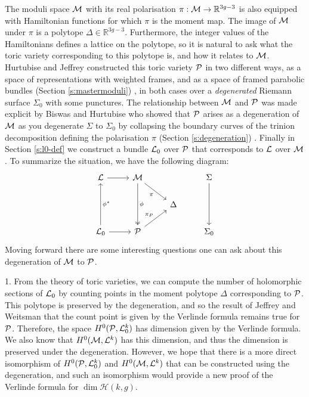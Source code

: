 The moduli space $\mathcal{M}$ with its real polarisation $\pi:\mathcal{M}\to\mathbb{R}^{3g-3}$ is also equipped with Hamiltonian functions for which $\pi$ is the moment map. The image of $\mathcal{M}$ under $\pi$ is a polytope $\Delta \in \mathbb{R}^{3g-3}$. Furthermore, the integer values of the Hamiltonians defines a lattice on the polytope, so it is natural to ask what the toric variety corresponding to this polytope is, and how it relates to $\mathcal{M}$. Hurtubise and Jeffrey constructed this toric variety $\mathcal{P}$ in two different ways, as a space of representations with weighted frames, and as a space of framed parabolic bundles (Section \ref{s:mastermoduli}) \cite{hurtubise_representations_2000}, in both cases over a \emph{degenerated} Riemann surface $\Sigma_0$ with some punctures. The relationship between $\mathcal{M}$ and $\mathcal{P}$ was made explicit by Biswas and Hurtubise who showed that $\mathcal{P}$ arises as a degeneration of $\mathcal{M}$ as you degenerate $\Sigma$ to $\Sigma_0$ by collapsing the boundary curves of the trinion decomposition defining the polarisation $\pi$ (Section \ref{s:degeneration}) \cite{biswas_degenerations_2021}. Finally in Section \ref{s:l0-def} we construct a bundle $\mathcal{L}_0$ over $\mathcal{P}$ that corresponds to $\mathcal{L}$ over $\mathcal{M}$. To summarize the situation, we have the following diagram:
\[\begin{tikzcd}[ampersand replacement=\&]
\LL \& \MM \&\& \Sigma \\
\&\& \Delta \\
{\LL_0} \& \cP \&\& {\Sigma_0}
\arrow["\phi", two heads, from=1-2, to=3-2]
\arrow["\pi"', from=1-2, to=2-3]
\arrow["{\pi_P}", from=3-2, to=2-3]
\arrow[from=1-1, to=1-2]
\arrow[from=3-1, to=3-2]
\arrow["{\phi^\ast}"', from=3-1, to=1-1]
\arrow[from=1-4, to=3-4]
\end{tikzcd}\]
Moving forward there are some interesting questions one can ask about this degeneration of $\mathcal{M}$ to $\mathcal{P}$. 

1. From the theory of toric varieties, we can compute the number of holomorphic sections of $\mathcal{L}_0$ by counting points in the moment polytope $\Delta$ corresponding to $\mathcal{P}$. This polytope is preserved by the degeneration, and so the result of Jeffrey and Weitsman that the count point is given by the Verlinde formula remains true for $\mathcal{P}$. Therefore, the space $H^0(\mathcal{P},\mathcal{L}^k_0)$ has dimension given by the Verlinde formula. We also know that $H^0(\mathcal{M},\mathcal{L}^k)$ has this dimension, and thus the dimension is preserved under the degeneration. However, we hope that there is a more direct isomorphism of $H^0(\mathcal{P},\mathcal{L}^k_0)$ and $H^0(\mathcal{M},\mathcal{L}^k)$ that can be constructed using the degeneration, and such an isomorphism would provide a new proof of the Verlinde formula for $\dim\mathcal{H}(k,g)$.

